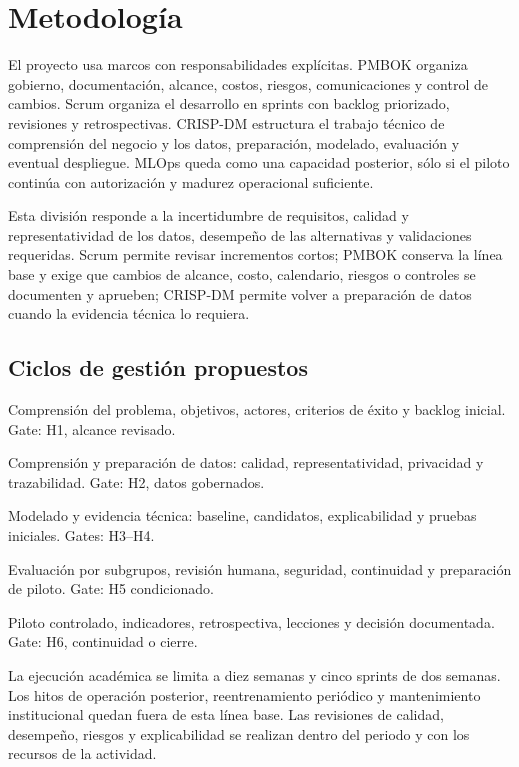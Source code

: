 \section{Metodología}

El proyecto usa marcos con responsabilidades explícitas. PMBOK organiza gobierno, documentación, alcance, costos, riesgos, comunicaciones y control de cambios. Scrum organiza el desarrollo en sprints con backlog priorizado, revisiones y retrospectivas. CRISP-DM estructura el trabajo técnico de comprensión del negocio y los datos, preparación, modelado, evaluación y eventual despliegue. MLOps queda como una capacidad posterior, sólo si el piloto continúa con autorización y madurez operacional suficiente.

Esta división responde a la incertidumbre de requisitos, calidad y representatividad de los datos, desempeño de las alternativas y validaciones requeridas. Scrum permite revisar incrementos cortos; PMBOK conserva la línea base y exige que cambios de alcance, costo, calendario, riesgos o controles se documenten y aprueben; CRISP-DM permite volver a preparación de datos cuando la evidencia técnica lo requiera.

\subsection{Ciclos de gestión propuestos}

\begin{description}[style=nextline]
  \item[Sprint 1] Comprensión del problema, objetivos, actores, criterios de éxito y backlog inicial. Gate: H1, alcance revisado.
  \item[Sprint 2] Comprensión y preparación de datos: calidad, representatividad, privacidad y trazabilidad. Gate: H2, datos gobernados.
  \item[Sprint 3] Modelado y evidencia técnica: baseline, candidatos, explicabilidad y pruebas iniciales. Gates: H3--H4.
  \item[Sprint 4] Evaluación por subgrupos, revisión humana, seguridad, continuidad y preparación de piloto. Gate: H5 condicionado.
  \item[Sprint 5] Piloto controlado, indicadores, retrospectiva, lecciones y decisión documentada. Gate: H6, continuidad o cierre.
\end{description}

La ejecución académica se limita a diez semanas y cinco sprints de dos semanas. Los hitos de operación posterior, reentrenamiento periódico y mantenimiento institucional quedan fuera de esta línea base. Las revisiones de calidad, desempeño, riesgos y explicabilidad se realizan dentro del periodo y con los recursos de la actividad.
